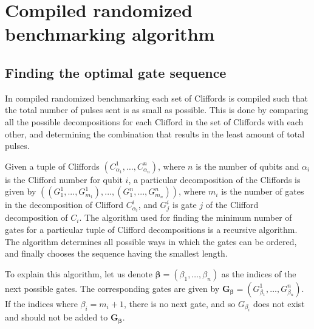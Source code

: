 \chapter{Compiled randomized benchmarking algorithm}
  \label{sec:compiled randomized benchmarking algorithm}
  \section{Finding the optimal gate sequence}
    In compiled randomized benchmarking each set of Cliffords is compiled such that the total number of pulses sent is as small as possible. This is done by comparing all the possible decompositions for each Clifford in the set of Cliffords with each other, and determining the combination that results in the least amount of total pulses.

    Given a tuple of Cliffords $\left(C_{\alpha_1}^1, \dots, C_{\alpha_n}^n\right)$, where $n$ is the number of qubits and $\alpha_i$ is the Clifford number for qubit $i$, a particular decomposition of the Cliffords is given by $\left(\left( G_1^1, ..., G_{m_1}^1 \right) , ..., \left(G_1^n, ..., G_{m_n}^n\right)\right)$, where $m_i$ is the number of gates in the decomposition of Clifford $C_{\alpha_i}^i$, and $G_j^i$ is gate $j$ of the Clifford decomposition of $C_i$. The algorithm used for finding the minimum number of gates for a particular tuple of Clifford decompositions is a recursive algorithm. The algorithm determines all possible ways in which the gates can be ordered, and finally chooses the sequence having the smallest length.

    To explain this algorithm, let us denote $\bm{\beta}=\left(\beta_1, \dots, \beta_n\right)$ as the indices of the next possible gates. The corresponding gates are given by $\bm{G_\bm{\beta}}=\left( G_{\beta_1}^1, \dots, G_{\beta_n}^n \right)$. If the indices where $\beta_i=m_i + 1$, there is no next gate, and so $G_{\beta_i}$ does not exist and should not be added to $\bm{G_\bm{\beta}}$.

